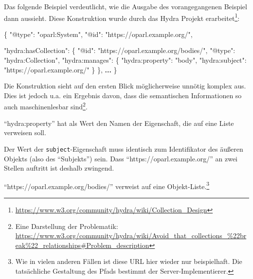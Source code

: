 \documentclass[,a4paper]{article}
\newenvironment{Shaded}{}{}
\newcommand{\DataTypeTok}[1]{\textcolor[rgb]{0.56,0.13,0.00}{{#1}}}
\newcommand{\StringTok}[1]{\textcolor[rgb]{0.25,0.44,0.63}{{#1}}}
\newcommand{\FunctionTok}[1]{\textcolor[rgb]{0.02,0.16,0.49}{{#1}}}
\newcommand{\ErrorTok}[1]{\textcolor[rgb]{1.00,0.00,0.00}{\textbf{{#1}}}}
\begin{document}
Das folgende Beispiel verdeutlicht, wie die Ausgabe des vorangegangenen
Beispiel dann aussieht. Diese Konstruktion wurde durch das Hydra Projekt
erarbeitet\footnote{\url{https://www.w3.org/community/hydra/wiki/Collection_Design}}:

\begin{Shaded}
\begin{Highlighting}[]
\FunctionTok{\{}
    \DataTypeTok{"@type"}\FunctionTok{:} \StringTok{"oparl:System"}\FunctionTok{,}
    \DataTypeTok{"@id"}\FunctionTok{:} \StringTok{"https://oparl.example.org/"}\FunctionTok{,}

    \DataTypeTok{"hydra:hasCollection"}\FunctionTok{:} \FunctionTok{\{}
        \DataTypeTok{"@id"}\FunctionTok{:} \StringTok{"https://oparl.example.org/bodies/"}\FunctionTok{,}
        \DataTypeTok{"@type"}\FunctionTok{:} \StringTok{"hydra:Collection"}\FunctionTok{,}
        \DataTypeTok{"hydra:manages"}\FunctionTok{:} \FunctionTok{\{}
            \DataTypeTok{"hydra:property"}\FunctionTok{:} \StringTok{"body"}\FunctionTok{,}
            \DataTypeTok{"hydra:subject"}\FunctionTok{:} \StringTok{"https://oparl.example.org/"}
        \FunctionTok{\}}
    \FunctionTok{\},}
    \ErrorTok{...}
\FunctionTok{\}}
\end{Highlighting}
\end{Shaded}

Die Konstruktion sieht auf den ersten Blick möglicherweise unnötig
komplex aus. Dies ist jedoch u.a. ein Ergebnis davon, dass die
semantischen Informationen so auch maschinenlesbar sind\footnote{Eine
  Darstellung der Problematik:
  \url{https://www.w3.org/community/hydra/wiki/Avoid_that_collections_\%22break\%22_relationships\#Problem_description}}.

``hydra:property'' hat als Wert den Namen der Eigenschaft, die auf eine
Liste verweisen soll.

Der Wert der \texttt{subject}-Eigenschaft muss identisch zum
Identifikator des äußeren Objekts (also des ``Subjekts'') sein. Dass
``https://oparl.example.org/'' an zwei Stellen auftritt ist deshalb
zwingend.

``https://oparl.example.org/bodies/'' verweist auf eine
Objekt-Liste.\footnote{Wie in vielen anderen Fällen ist diese URL hier
  wieder nur beispielhaft. Die tatsächliche Gestaltung des Pfads
  bestimmt der Server-Implementierer.}

\end{document}
